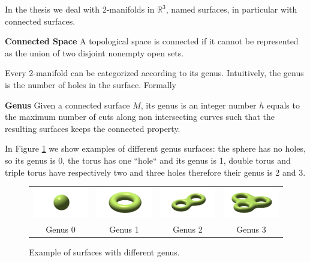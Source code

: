 In the thesis we deal with 2-manifolds in $\mathbb{R}^3$, named surfaces, in particular with connected surfaces. 

\begin{mydef}
\textbf{Connected Space}
A topological space is connected if it cannot be represented as the union of two disjoint nonempty open sets. 
\end{mydef}

Every 2-manifold can be categorized according to its genus. Intuitively, the genus is the number of holes in the surface. Formally


 
\begin{mydef}
\textbf{Genus}
Given a connected surface $M$, its genus is an integer number $h$ equals to the maximum number of cuts along non intersecting curves such that the resulting surfaces keeps the connected property.
\end{mydef}

In Figure \ref{fig:torus} we show examples of different genus surfaces: the sphere has no holes, so its genus is 0, the torus has one ``hole`` and its genus is 1, double torus and triple torus have respectively two and three holes therefore their genus is 2 and 3.
\begin{figure}

 \begin{tabular}{cccc}
  \includegraphics[width=0.21\columnwidth]{./img/sphere}&
  \includegraphics[width=0.21\columnwidth]{./img/torus}&
  \includegraphics[width=0.21\columnwidth]{./img/doubleTorus}&
  \includegraphics[width=0.21\columnwidth]{./img/tripletorus}\\
  Genus 0 & Genus 1 & Genus 2 & Genus 3
 \end{tabular}
 \caption{Example of surfaces with different genus.}
 \label{fig:torus}
\end{figure}



